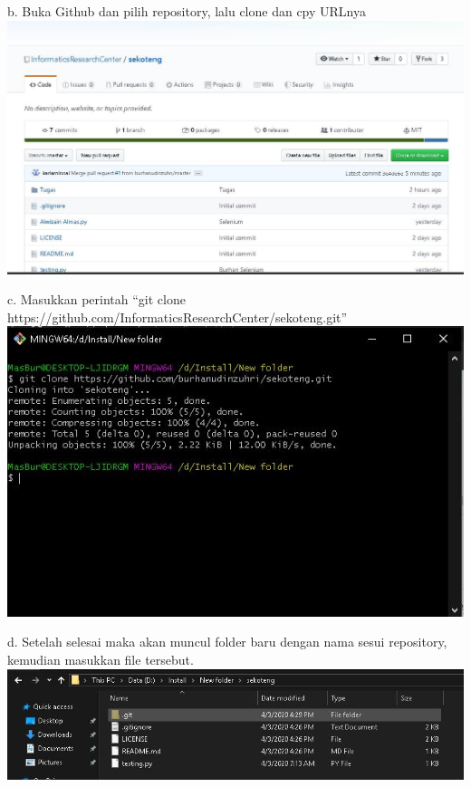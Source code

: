 \documentclass{article}
\begin{document}
                \newline
            \item b. Buka Github dan pilih repository, lalu clone dan cpy URLnya
                \newline
                \includegraphics[scale=0.3]{33.3b.jpg}
                \newline
            \item c. Masukkan perintah “git clone https://github.com/InformaticsResearchCenter/sekoteng.git”
                \newline
                \includegraphics[scale=0.4]{33.3c.jpg}
                \newline
            \item d. Setelah selesai maka akan muncul folder baru dengan nama sesui repository, kemudian masukkan file tersebut.
                \newline
                \includegraphics[scale=0.5]{33.3d.jpg}
\end{document}
